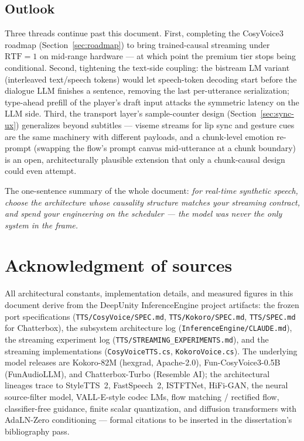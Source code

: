 \documentclass[11pt,a4paper]{article}
\newcommand{\RTF}{\ensuremath{\mathrm{RTF}}}
\newcommand{\code}[1]{\texttt{#1}}
\begin{document}
\subsection{Outlook}

Three threads continue past this document. First, completing the CosyVoice3 roadmap
(Section~\ref{sec:roadmap}) to bring trained-causal streaming under $\RTF = 1$ on
mid-range hardware --- at which point the premium tier stops being conditional.
Second, tightening the text-side coupling: the bistream LM variant (interleaved
text/speech tokens) would let speech-token decoding start before the dialogue LLM
finishes a sentence, removing the last per-utterance serialization; type-ahead prefill
of the player's draft input attacks the symmetric latency on the LLM side. Third, the
transport layer's sample-counter design (Section~\ref{sec:sync-ux}) generalizes
beyond subtitles --- viseme streams for lip sync and gesture cues are the same
machinery with different payloads, and a chunk-level emotion re-prompt (swapping the
flow's prompt canvas mid-utterance at a chunk boundary) is an open, architecturally
plausible extension that only a chunk-causal design could even attempt.

The one-sentence summary of the whole document: \emph{for real-time synthetic speech,
choose the architecture whose causality structure matches your streaming contract, and
spend your engineering on the scheduler --- the model was never the only system in the
frame.}

\section*{Acknowledgment of sources}

All architectural constants, implementation details, and measured figures in this
document derive from the DeepUnity InferenceEngine project artifacts: the frozen port
specifications (\code{TTS/CosyVoice/SPEC.md}, \code{TTS/Kokoro/SPEC.md},
\code{TTS/SPEC.md} for Chatterbox), the subsystem architecture log
(\code{InferenceEngine/CLAUDE.md}), the streaming experiment log
(\code{TTS/STREAMING\_EXPERIMENTS.md}), and the streaming implementations
(\code{CosyVoiceTTS.cs}, \code{KokoroVoice.cs}). The underlying model releases are
Kokoro-82M (hexgrad, Apache-2.0), Fun-CosyVoice3-0.5B (FunAudioLLM), and
Chatterbox-Turbo (Resemble AI); the architectural lineages trace to StyleTTS~2,
FastSpeech~2, ISTFTNet, HiFi-GAN, the neural source-filter model, VALL-E-style codec
LMs, flow matching / rectified flow, classifier-free guidance, finite scalar
quantization, and diffusion transformers with AdaLN-Zero conditioning --- formal
citations to be inserted in the dissertation's bibliography pass.
\end{document}
